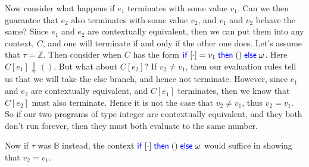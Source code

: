 \documentclass[twoside,11pt,openright]{report}
\theoremstyle{definition}
\newcommand{\Keyword}[1]{{\color{blue} \mathsf{#1}}}
\newcommand{\expr}{e}
\newcommand{\val}{v}
\newcommand{\TT}{()}
\newcommand{\IfCmd}{\Keyword{if}}
\newcommand{\ThenCmd}{\Keyword{then}}
\newcommand{\ElseCmd}{\Keyword{else}}
\def\If#1then#2else#3{\IfCmd{}\;#1\;\ThenCmd{}\;#2\;\ElseCmd{}\;#3}
\newcommand{\empctx}{[\cdot]}
\newcommand{\ctx}{C}
\newcommand{\Tint}{\mathbb{Z}}
\newcommand{\Tbool}{\mathbb{B}}
\newcommand{\typ}{\tau}
\begin{document}
Now consider what happens if $\expr_1$ terminates with some value $\val_1$. Can we then guarantee that $\expr_2$ also terminates with some value $\val_2$, and $\val_1$ and $\val_2$ behave the same? Since $\expr_1$ and $\expr_2$ are contextually equivalent, then we can put them into any context, $\ctx$, and one will terminate if and only if the other one does.
Let's assume that $\typ = \Tint$. Then consider when $\ctx$ has the form $\If \empctx = \val_1 then \TT else \omega$. Here $\ctx[\expr_1] \Downarrow \TT$. But what about $\ctx[\expr_2]$? If $\val_2 \neq \val_1$, then our evaluation rules tell us that we will take the else branch, and hence not terminate. However, since $\expr_1$ and $\expr_2$ are contextually equivalent, and $\ctx[\expr_1]$ terminates, then we know that $\ctx[\expr_2]$ must also terminate. Hence it is not the case that $\val_2 \neq \val_1$, thus $\val_2 = \val_1$. So if our two programs of type integer are contextually equivalent, and they both don't run forever, then they must both evaluate to the same number.

Now if $\typ$ was $\Tbool$ instead, the context $\If \empctx then \TT else \omega$ would suffice in showing that $\val_2 = \val_1$. 
\end{document}
